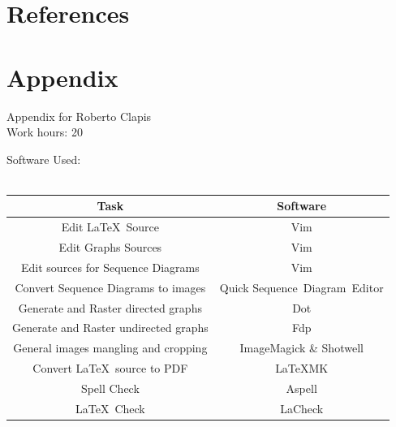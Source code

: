 \documentclass{article}
\begin{document}
\section{References}
\clearpage
\section{Appendix}
Appendix for Roberto Clapis\\
Work hours: 20
\begin{center}
	Software Used:\\
	\-\\
	\begin{tabular}{*{2}{c}}
		\toprule
		Task & Software \\
		\midrule
		Edit \LaTeX\ Source & Vim\\
		Edit Graphs Sources & Vim\\
		Edit sources for Sequence Diagrams & Vim\\
		Convert Sequence Diagrams to images & Quick Sequence Diagram Editor\\
		Generate and Raster directed graphs& Dot\\
		Generate and Raster undirected graphs& Fdp\\
		General images mangling and cropping & ImageMagick \& Shotwell\\
		Convert \LaTeX\ source to PDF & \LaTeX\-MK\\
		Spell Check & Aspell \\
		\LaTeX\ Check & LaCheck\\
		\bottomrule
	\end{tabular}
\end{center}
\-\\
\-\\

\end{document}
